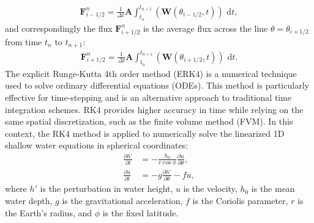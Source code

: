 \begin{align*}
    \mathbf{F}_{i-1/2}^n = \frac{1}{\Delta t} \mathbf{A} \int_{t_n}^{t_{n+1}} (\mathbf{W}(\theta_{i-1/2}, t)) \text{ d}t,
\end{align*}
and correspondingly the flux $\mathbf{F}_{i+1/2}^n$ is the average flux across the line $\theta = \theta_{i+1/2}$ from time $t_n$ to $t_{n+1}$:
\begin{align*}
    \mathbf{F}_{i+1/2}^n = \frac{1}{\Delta t} \mathbf{A} \int_{t_n}^{t_{n+1}} (\mathbf{W}(\theta_{i+1/2}, t)) \text{ d}t.
\end{align*}
The explicit Runge-Kutta 4th order method (ERK4) is a numerical technique used to solve ordinary differential equations (ODEs).
This method is particularly effective for time-stepping and is an alternative approach to traditional time integration schemes.
RK4 provides higher accuracy in time while relying on the same spatial discretization, such as the finite volume method (FVM).
In this context, the RK4 method is applied to numerically solve the linearized 1D shallow water equations in spherical coordinates:
\begin{subequations}
    \begin{align}
        \frac{\partial h'}{\partial t} &= -\frac{h_0}{r \cos\phi} \frac{\partial u}{\partial \theta}, \\
        \frac{\partial u}{\partial t} &= -g \frac{\partial h'}{\partial \theta} - f u,
    \end{align}
\end{subequations}
where \(h'\) is the perturbation in water height, \(u\) is the velocity, \(h_0\) is the mean water depth, \(g\) is the gravitational acceleration, \(f\) is the Coriolis parameter, \(r\) is the Earth's radius, and \(\phi\) is the fixed latitude. 
